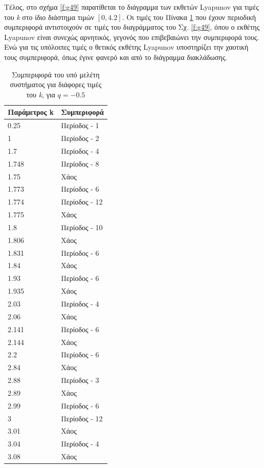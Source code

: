 Τέλος, στο σχήμα \ref{f:g49} παρατίθεται το διάγραμμα των εκθετών Lyapunov για τιμές του \emph{k} στο ίδιο διάστημα τιμών $[0, 4.2]$. Οι τιμές του Πίνακα \ref{tab:abc11} που έχουν περιοδική συμπεριφορά αντιστοιχούν σε τιμές του διαγράμματος του Σχ. \ref{f:g49}, όπου ο εκθέτης Lyapunov είναι συνεχώς αρνητικός, γεγονός που επιβεβαιώνει την συμπεριφορά τους. Ενώ για τις υπόλοιπες τιμές ο θετικός εκθέτης Lyapunov υποστηρίζει την χαοτική τους συμπεριφορά, όπως έγινε φανερό και από το διάγραμμα διακλάδωσης.





\begin{table}[ht]
	\centering
	\caption{ Συμπεριφορά του υπό μελέτη συστήματος για διάφορες τιμές του \emph{k}, για $q=-0.5$ }
	\label{tab:abc11}
	\begin{tabular}{l | l}
		Παράμετρος k & Συμπεριφορά \\
		\hline
		0.25 &  Περίοδος -  1 \\
		1 &  Περίοδος -  2 \\
		1.7& Περίοδος -  4 \\
		1.748& Περίοδος -  8 \\
		1.75 & Xάος \\
		1.773& Περίοδος - 6 \\
		1.774& Περίοδος - 12\\
		1.775& Χάος \\
		1.8& Περίοδος - 10 \\
		1.806 &  Χάος \\
		1.831 &  Περίοδος -  6 \\
		1.84 &  Χάος \\
		1.93 & Περίοδος - 6\\
		1.935 &Χάος \\
		2.03 &  Περίοδος -  4\\
		2.06 &Χάος \\
		2.141 & Περίοδος -  6\\
		2.144& Χάος\\
		2.2& Περίοδος - 6\\
		2.84 & Χάος\\
		2.88& Περίοδος -  3\\
		2.89 & Χάος\\
		2.99 &  Περίοδος -  6\\
		3 &  Περίοδος - 12\\
		3.01 &  Χάος\\
		3.04 & Περίοδος - 4\\
		3.08 & Χάος\\

\end{tabular}
\end{table}
